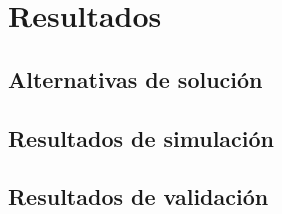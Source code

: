 \chapter{Resultados}

\section{Alternativas de solución}

\section{Resultados de simulación}

\section{Resultados de validación}
